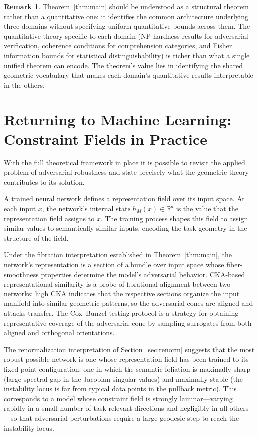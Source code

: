 \documentclass[12pt,a4paper]{article}
\theoremstyle{plain}
\theoremstyle{definition}
\newtheorem{remark}[theorem]{Remark}
\begin{document}
\begin{remark}
Theorem~\ref{thm:main} should be understood as a structural theorem rather
than a quantitative one: it identifies the common architecture underlying
three domains without specifying uniform quantitative bounds across them. The
quantitative theory specific to each domain (NP-hardness results for adversarial
verification, coherence conditions for comprehension categories, and Fisher
information bounds for statistical distinguishability) is richer than what a
single unified theorem can encode. The theorem's value lies in identifying the
shared geometric vocabulary that makes each domain's quantitative results
interpretable in the others.
\end{remark}

\section{Returning to Machine Learning: Constraint Fields in Practice}

With the full theoretical framework in place it is possible to revisit the
applied problem of adversarial robustness and state precisely what the
geometric theory contributes to its solution.

A trained neural network defines a representation field over its input space.
At each input $x$, the network's internal state $h_M(x) \in \mathbb{R}^d$
is the value that the representation field assigns to $x$. The training process
shapes this field to assign similar values to semantically similar inputs,
encoding the task geometry in the structure of the field.

Under the fibration interpretation established in Theorem~\ref{thm:main}, the
network's representation is a section of a bundle over input space whose
fiber-smoothness properties determine the model's adversarial behavior.
CKA-based representational similarity is a probe of fibrational alignment
between two networks: high CKA indicates that the respective sections organize
the input manifold into similar geometric patterns, so the adversarial cones
are aligned and attacks transfer. The Cox--Bunzel testing protocol is a strategy
for obtaining representative coverage of the adversarial cone by sampling
surrogates from both aligned and orthogonal orientations.

The renormalization interpretation of Section~\ref{sec:renorm} suggests that
the most robust possible network is one whose representation field has been
trained to its fixed-point configuration: one in which the semantic foliation
is maximally sharp (large spectral gap in the Jacobian singular values) and
maximally stable (the instability locus is far from typical data points in
the pullback metric). This corresponds to a model whose constraint field is
strongly laminar---varying rapidly in a small number of task-relevant directions
and negligibly in all others---so that adversarial perturbations require a large
geodesic step to reach the instability locus.
\end{document}

